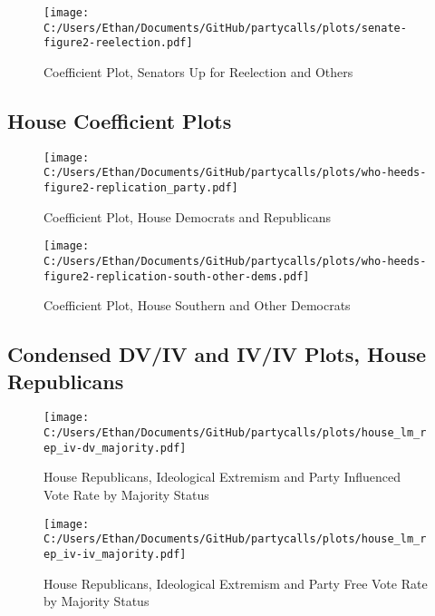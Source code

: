 \documentclass[12pt]{article}
\begin{document}
\begin{figure}[ht]
	\centering
	\caption{Coefficient Plot, Senators Up for Reelection and Others}
	\texttt{[image: C:/Users/Ethan/Documents/GitHub/partycalls/plots/senate-figure2-reelection.pdf]}
\end{figure}

\clearpage

\subsection{House Coefficient Plots}

\begin{figure}[ht]
	\centering
	\caption{Coefficient Plot, House Democrats and Republicans}
	\texttt{[image: C:/Users/Ethan/Documents/GitHub/partycalls/plots/who-heeds-figure2-replication\_party.pdf]}
\end{figure}

\begin{figure}[ht]
	\centering
	\caption{Coefficient Plot, House Southern and Other Democrats}
	\texttt{[image: C:/Users/Ethan/Documents/GitHub/partycalls/plots/who-heeds-figure2-replication-south-other-dems.pdf]}
\end{figure}

\clearpage

\subsection{Condensed DV/IV and IV/IV Plots, House Republicans}

\begin{figure}[h]
	\centering
	\caption{House Republicans, Ideological Extremism and Party Influenced Vote Rate by Majority Status}
	\texttt{[image: C:/Users/Ethan/Documents/GitHub/partycalls/plots/house\_lm\_rep\_iv-dv\_majority.pdf]}
\end{figure}


\begin{figure}[h]
	\centering
	\caption{House Republicans, Ideological Extremism and Party Free Vote Rate by Majority Status}
	\texttt{[image: C:/Users/Ethan/Documents/GitHub/partycalls/plots/house\_lm\_rep\_iv-iv\_majority.pdf]}
\end{figure}
\end{document}
